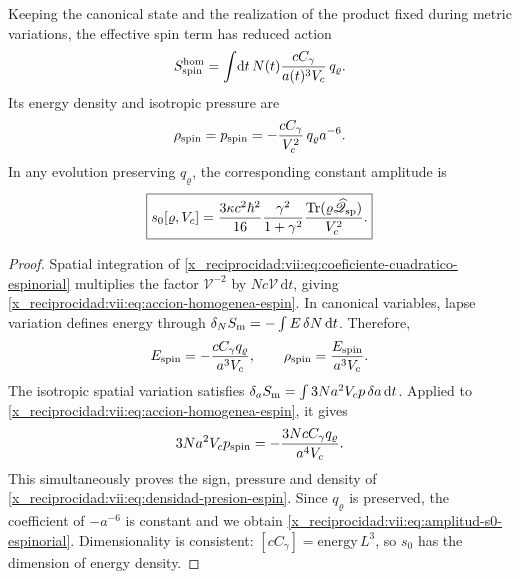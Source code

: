 \begin{theorem}
\label{x_reciprocidad:vii:thm:amplitud-material-explicita}
Keeping the canonical state and the realization of the product fixed
during metric variations, the effective spin term has
reduced action
\begin{equation}
 S_{\rm spin}^{\rm hom}
 =\int\!\mathrm dt\,N(t)
       \frac{cC_\gamma}{a(t)^3V_c}\,q_\varrho.
 \label{x_reciprocidad:vii:eq:accion-homogenea-espin}
\end{equation}
Its energy density and isotropic pressure are
\begin{equation}
 \rho_{\rm spin}=p_{\rm spin}
 =-\frac{cC_\gamma}{V_c^2}\,q_\varrho a^{-6}.
 \label{x_reciprocidad:vii:eq:densidad-presion-espin}
\end{equation}
In any evolution preserving \(q_\varrho\), the corresponding
constant amplitude is
\begin{equation}
 \boxed{\displaystyle
 s_0[\varrho,V_c]
 =\frac{3\kappa c^2\hbar^2}{16}
    \frac{\gamma^2}{1+\gamma^2}
    \frac{\operatorname{Tr}
       (\varrho\widehat{\mathscr Q}_{\rm sp})}{V_c^2}.}
 \label{x_reciprocidad:vii:eq:amplitud-s0-espinorial}
\end{equation}
\end{theorem}
\begin{proof}
Spatial integration of
\eqref{x_reciprocidad:vii:eq:coeficiente-cuadratico-espinorial} multiplies the
factor \(\mathcal V^{-2}\) by
\(Nc\mathcal V\,\mathrm dt\), giving
\eqref{x_reciprocidad:vii:eq:accion-homogenea-espin}. In canonical variables,
lapse variation defines energy through
\(\delta_N S_{\rm m}=-\int E\,\delta N\,\mathrm dt\).
Therefore,
\[
 E_{\rm spin}=-\frac{cC_\gamma q_\varrho}{a^3V_c},
 \qquad \rho_{\rm spin}=\frac{E_{\rm spin}}{a^3V_c}.
\]
The isotropic spatial variation satisfies
\(\delta_a S_{\rm m}=\int3Na^2V_c p\,\delta a\,\mathrm dt\).
Applied to \eqref{x_reciprocidad:vii:eq:accion-homogenea-espin}, it gives
\[
 3Na^2V_c p_{\rm spin}
 =-\frac{3NcC_\gamma q_\varrho}{a^4V_c}.
\]
This simultaneously proves the sign, pressure and density of
\eqref{x_reciprocidad:vii:eq:densidad-presion-espin}. Since
\(q_\varrho\) is preserved, the coefficient of \(-a^{-6}\) is constant and
we obtain \eqref{x_reciprocidad:vii:eq:amplitud-s0-espinorial}. Dimensionality
is consistent: \([cC_\gamma]=\text{energy}\,L^3\),
so \(s_0\) has the dimension of energy density.
\end{proof}

